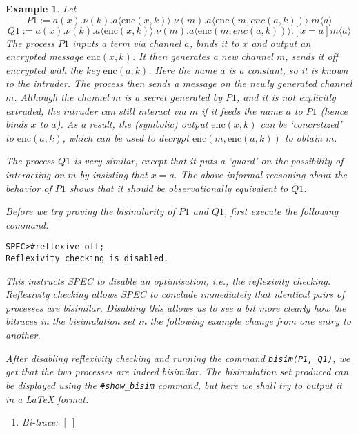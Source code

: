 \documentclass{article}
\newenvironment{example}{\begin{exa} \rm}{\end{exa}}
\newtheorem{exa}[theorem]{Example}
\begin{document}
\begin{example}
Let 
$$
P1   := a(x).\nu (k).a\langle \mathrm{enc}(x,k) \rangle. \nu (m).a\langle \mathrm{enc}(m,enc(a,k)) \rangle.m\langle a \rangle
$$
$$
Q1   := a(x).\nu (k).a\langle \mathrm{enc}(x,k) \rangle. \nu (m).a\langle \mathrm{enc}(m,enc(a,k)) \rangle.[x = a] m \langle a \rangle
$$
The process $P1$ inputs a term via channel $a$, binds it to $x$ and output
an encrypted message $\mathrm{enc}(x,k)$. It then generates a new channel $m$,
sends it off encrypted with the key $\mathrm{enc}(a,k)$. Here the name $a$ is a constant,
so it is known to the intruder. The process then sends a message on the newly generated
channel $m$. Although the channel $m$ is a secret generated by $P1$, and it is not
explicitly extruded, the intruder can still interact via $m$ if it feeds the name $a$
to $P1$ (hence binds $x$ to $a$). As a result, the (symbolic) output $\mathrm{enc}(x,k)$
can be `concretized' to $\mathrm{enc}(a,k)$, which can be used to decrypt 
$\mathrm{enc}(m, \mathrm{enc}(a,k))$ to obtain $m.$

The process $Q1$ is very similar, except that it puts a `guard' on the possibility of interacting
on $m$ by insisting that $x = a.$ The above informal reasoning about the behavior of $P1$
shows that it should be observationally equivalent to $Q1$. 

Before we try proving the bisimilarity of $P1$ and $Q1$, first execute the following command:
\begin{verbatim}
SPEC>#reflexive off; 
Reflexivity checking is disabled.
\end{verbatim}
This instructs SPEC to disable an optimisation, i.e., the reflexivity checking.
Reflexivity checking allows SPEC to conclude immediately that identical pairs of processes
are bisimilar. Disabling this allows us to see a bit more clearly how the bitraces
in the bisimulation set in the following example change from one entry to another. 

After disabling reflexivity checking 
and running the command \texttt{bisim(P1, Q1)}, we get that the two processes are indeed bisimilar.
The bisimulation set produced can be displayed using the \texttt{\#show\_bisim} command, but here
we shall try to output it in a LaTeX format:
\begin{enumerate} 
\item 
Bi-trace: 
$[~]$


\end{enumerate}
\end{example}
\end{document}
